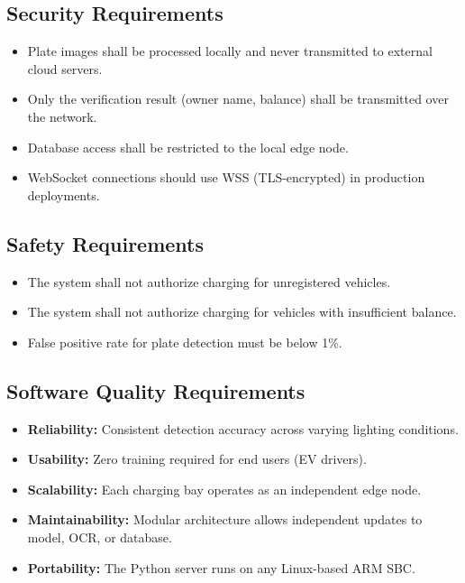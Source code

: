 \documentclass[11pt]{report}
\begin{document}
\subsection{Security Requirements}
\begin{itemize}
    \item Plate images shall be processed locally and never transmitted to external cloud servers.
    \item Only the verification result (owner name, balance) shall be transmitted over the network.
    \item Database access shall be restricted to the local edge node.
    \item WebSocket connections should use WSS (TLS-encrypted) in production deployments.
\end{itemize}

\subsection{Safety Requirements}
\begin{itemize}
    \item The system shall not authorize charging for unregistered vehicles.
    \item The system shall not authorize charging for vehicles with insufficient balance.
    \item False positive rate for plate detection must be below 1\%.
\end{itemize}

\subsection{Software Quality Requirements}
\begin{itemize}
    \item \textbf{Reliability:} Consistent detection accuracy across varying lighting conditions.
    \item \textbf{Usability:} Zero training required for end users (EV drivers).
    \item \textbf{Scalability:} Each charging bay operates as an independent edge node.
    \item \textbf{Maintainability:} Modular architecture allows independent updates to model, OCR, or database.
    \item \textbf{Portability:} The Python server runs on any Linux-based ARM SBC.
\end{itemize}
\end{document}
